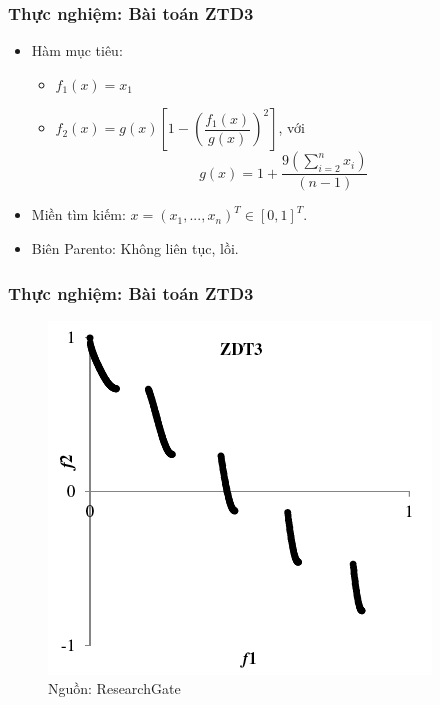 \documentclass{beamer}
\begin{document}

    \begin{frame}
    \frametitle{\textbf{Thực nghiệm: Bài toán ZTD3}}
        \begin{itemize}
            \item Hàm mục tiêu:
            \begin{itemize}
                \item $ f_1(x) = x_1 $
                \item $ f_2(x) = g(x) \left[ 1 - \left( \dfrac{f_1(x)}{g(x)} \right)^2 \right] $, với
                $$ g(x) = 1 +\dfrac{9 \left( \sum\limits_{i = 2}^n x_i \right)}{(n - 1)} $$
            \end{itemize}
            \item Miền tìm kiếm: $ x = (x_1, ..., x_n)^T \in \left[0, 1\right]^T $.
            \item Biên Parento: Không liên tục, lồi.
        \end{itemize}
    \end{frame}

    \begin{frame} 
    \frametitle{\textbf{Thực nghiệm: Bài toán ZTD3}}
        \begin{figure}[!h]
            \center
            \includegraphics[width=0.6\linewidth]{zdt3-pf}
            \caption{Nguồn: ResearchGate}
        \end{figure}

    \end{frame}

    
\end{document}
